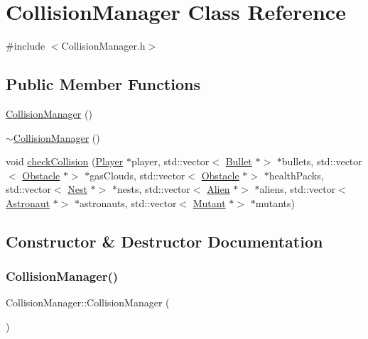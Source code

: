 \hypertarget{class_collision_manager}{}\section{Collision\+Manager Class Reference}
\label{class_collision_manager}


{\ttfamily \#include $<$Collision\+Manager.\+h$>$}

\subsection*{Public Member Functions}
\begin{DoxyCompactItemize}
\item 
\hyperlink{class_collision_manager_a81f0b3f0cc0268c80f54714cd7ddb55f}{Collision\+Manager} ()
\item 
\hyperlink{class_collision_manager_acdbb3c842f0ef1c7a028d3f080855766}{$\sim$\+Collision\+Manager} ()
\item 
void \hyperlink{class_collision_manager_afc1b2d0d08aeed558617c071a68f0d98}{check\+Collision} (\hyperlink{class_player}{Player} $\ast$player, std\+::vector$<$ \hyperlink{class_bullet}{Bullet} $\ast$$>$ $\ast$bullets, std\+::vector$<$ \hyperlink{class_obstacle}{Obstacle} $\ast$$>$ $\ast$gas\+Clouds, std\+::vector$<$ \hyperlink{class_obstacle}{Obstacle} $\ast$$>$ $\ast$health\+Packs, std\+::vector$<$ \hyperlink{class_nest}{Nest} $\ast$$>$ $\ast$nests, std\+::vector$<$ \hyperlink{class_alien}{Alien} $\ast$$>$ $\ast$aliens, std\+::vector$<$ \hyperlink{class_astronaut}{Astronaut} $\ast$$>$ $\ast$astronauts, std\+::vector$<$ \hyperlink{class_mutant}{Mutant} $\ast$$>$ $\ast$mutants)
\end{DoxyCompactItemize}


\subsection{Constructor \& Destructor Documentation}
\mbox{\label{class_collision_manager_a81f0b3f0cc0268c80f54714cd7ddb55f}} 
\subsubsection{\texorpdfstring{Collision\+Manager()}{CollisionManager()}}
{\footnotesize\ttfamily Collision\+Manager\+::\+Collision\+Manager (\begin{DoxyParamCaption}{ }\end{DoxyParamCaption})}

